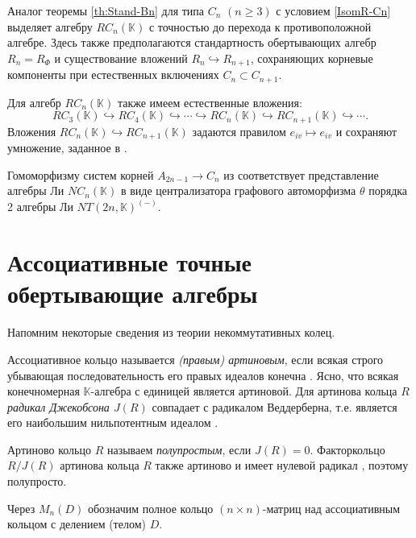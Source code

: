 \documentclass[a4paper,14pt,oneside,openany]{memoir}
\begin{document}
\begin{remark}\label{remark:Stand-Cn}
    Аналог теоремы \ref{th:Stand-Bn} для типа $C_n$ $(n\geq 3)$ с условием
    \eqref{IsomR-Cn} выделяет алгебру $RC_n(\mathbb{K})$ с точностью до перехода к
    противоположной алгебре. Здесь также предполагаются стандартность обертывающих
    алгебр $R_n=R_{\Phi}$ и существование вложений $R_n\hookrightarrow R_{n+1}$,
    сохраняющих корневые компоненты при естественных включениях $C_n\subset
    C_{n+1}$.

    Для алгебр $RC_n(\mathbb{K})$ также имеем естественные вложения:
    \[
        RC_3(\mathbb{K})\hookrightarrow RC_4(\mathbb{K})\hookrightarrow \cdots\hookrightarrow
        RC_n(\mathbb{K})\hookrightarrow RC_{n+1}(\mathbb{K})\hookrightarrow\cdots.
    \]
    Вложения $RC_n(\mathbb{K})\hookrightarrow RC_{n+1}(\mathbb{K})$ задаются
    правилом $e_{iv}\mapsto e_{iv}$ и сохраняют умножение, заданное в
    .

    Гомоморфизму систем корней $A_{2n-1}\to C_n$ из \cite[лемма~7]{VLev-82MZ}
    соответствует представление алгебры Ли $NC_n(\mathbb{K})$ в виде централизатора
    графового автоморфизма $\theta$ порядка 2 алгебры Ли $NT(2n,\mathbb{K})^{(-)}$.
\end{remark}

\section{Ассоциативные точные обертывающие алгебры}\label{sec:associative-envelopes}

Напомним некоторые сведения из теории некоммутативных колец.

Ассоциативное кольцо называется \emph{(правым) артиновым}, если всякая строго
убывающая последовательность его правых идеалов конечна
\cite[\S~1.3]{herstein-ru}. Ясно, что всякая конечномерная $\mathbb{K}$-алгебра
с единицей является артиновой. Для артинова кольца $R$ \emph{радикал Джекобсона
    $J(R)$} совпадает с радикалом Веддерберна, т.\:е. является его наибольшим
нильпотентным идеалом \cite[лемма~1.2.2, теорема~1.3.1]{herstein-ru}.

Артиново кольцо $R$ называем \emph{полупростым}, если $J(R)=0$. Факторкольцо
$R/J(R)$ артинова кольца $R$ также артиново и имеет нулевой радикал
\cite[теорема~1.2.4]{herstein-ru}, поэтому полупросто.

Через $M_n(D)$ обозначим полное кольцо $(n \times n)$-матриц над ассоциативным
кольцом с делением (телом) $D$.
\end{document}
